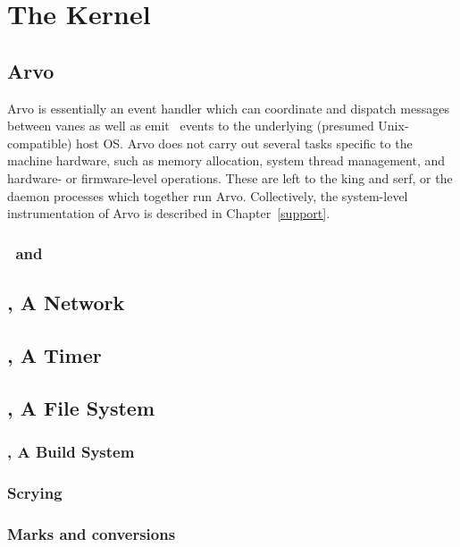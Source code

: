 \setchapterpreamble[u]{\margintoc}
\chapter{The Kernel}


\section{Arvo}

Arvo is essentially an event handler which can coordinate and dispatch messages between vanes as well as emit \unix~events to the underlying (presumed Unix-compatible) host OS.  Arvo does not carry out several tasks specific to the machine hardware, such as memory allocation, system thread management, and hardware- or firmware-level operations.  These are left to the king and serf, or the daemon processes which together run Arvo.  Collectively, the system-level instrumentation of Arvo is described in Chapter~\ref{support}.

\subsection{\zuse~and \lull}

\section{\ames, A Network}

\section{\behn, A Timer}

\section{\clay, A File System}

\subsection{\ford, A Build System}

\subsection{Scrying}

\subsection{Marks and conversions}

